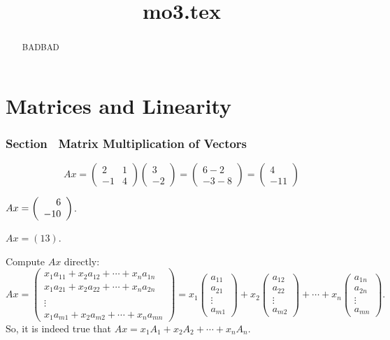 \documentclass{ximera}
\title{mo3.tex}
\begin{document}
\begin{abstract}
BADBAD
\end{abstract}
\maketitle

\chapter{Matrices and Linearity}

\subsection*{Section~\protect{\ref{S:4.1}} Matrix Multiplication of Vectors}

\[
Ax =
\left(\begin{array}{rr} 2 & 1 \\ -1 & 4\end{array}\right)
\left(\begin{array}{r} 3 \\ -2\end{array}\right) =
\left(\begin{array}{r} 6 - 2 \\ -3 - 8\end{array}\right) =
\left(\begin{array}{r} 4 \\ -11\end{array}\right)
\]

 $Ax = \left(\begin{array}{r} 6 \\ -10\end{array}\right)$.

 $Ax = \left(13\right)$.

Compute $Ax$ directly:
\[ Ax = \left(\begin{array}{c} x_1a_{11} + x_2a_{12} + \cdots +
x_na_{1n} \\  x_1a_{21} + x_2a_{22} + \cdots + x_na_{2n} \\
\\ \vdots \\ x_1a_{m1} + x_2a_{m2} + \cdots + x_na_{mn}
\end{array}\right) = x_1\left(\begin{array}{r} a_{11} \\ a_{21} \\
\vdots \\ a_{m1} \end{array}\right) + x_2\left(\begin{array}{r}
a_{12} \\ a_{22} \\ \vdots \\ a_{m2} \end{array}\right) + \cdots
+ x_n\left(\begin{array}{r} a_{1n} \\ a_{2n} \\
\vdots \\ a_{mn} \end{array}\right). \]
So, it is indeed true that $Ax = x_1A_1 + x_2A_2 + \cdots
+ x_nA_n$.
\end{document}
